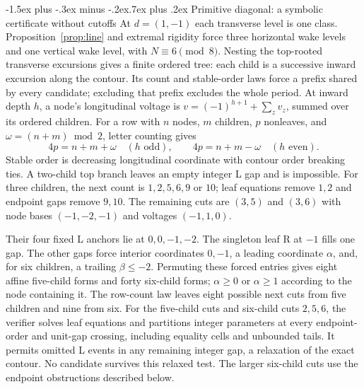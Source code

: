 \documentclass[11pt,letterpaper]{article}
\makeatletter
\renewcommand\subsection{\@startsection{subsection}{2}{\z@}%
  {-1.5ex plus -.3ex minus -.2ex}{.7ex plus .2ex}%
  {\normalfont\large\bfseries}}
\makeatother
\begin{document}
\subsection{Primitive diagonal: a symbolic certificate without cutoffs}
At $d=(1,-1)$ each transverse level is one class.
Proposition~\ref{prop:line} and extremal rigidity force three horizontal
wake levels and one vertical wake level, with $N\equiv6\pmod8$.
Nesting the top-rooted transverse excursions gives a finite ordered
tree: each child is a successive inward excursion along the contour.
Its count and stable-order laws force a prefix shared by every candidate;
excluding that prefix excludes the whole period. At inward depth $h$,
a node's longitudinal voltage is
$v=(-1)^{h+1}+\sum_zv_z$, summed over its ordered children.
For a row with $n$ nodes, $m$ children, $p$ nonleaves, and
$\omega=(n+m)\bmod2$, letter counting gives
\[
4p=n+m+\omega\quad(h\text{ odd}),\qquad
4p=n+m-\omega\quad(h\text{ even}).
\]
Stable order is decreasing longitudinal coordinate with contour order
breaking ties. A two-child top branch leaves an empty integer L gap and
is impossible. For three children, the next count is
$1,2,5,6,9$ or $10$; leaf equations remove $1,2$ and endpoint gaps
remove $9,10$. The remaining cuts are $(3,5)$ and $(3,6)$ with
node bases $(-1,-2,-1)$ and voltages $(-1,1,0)$.

Their four fixed L anchors lie at $0,0,-1,-2$.
The singleton leaf R at $-1$ fills one gap. The other gaps force
interior coordinates $0,-1$, a leading coordinate $\alpha$, and,
for six children, a trailing $\beta\le-2$. Permuting these forced
entries gives eight affine five-child forms and forty six-child forms;
$\alpha\ge0$ or $\alpha\ge1$ according to the node containing it.
The row-count law leaves eight possible next cuts from five children
and nine from six. For the five-child cuts and six-child cuts $2,5,6$,
the verifier solves leaf equations and partitions integer parameters at
every endpoint-order and unit-gap crossing, including equality cells and
unbounded tails. It permits omitted L events in any remaining integer
gap, a relaxation of the exact contour. No candidate survives this relaxed test.
The larger six-child cuts use the endpoint obstructions described below.
\end{document}
